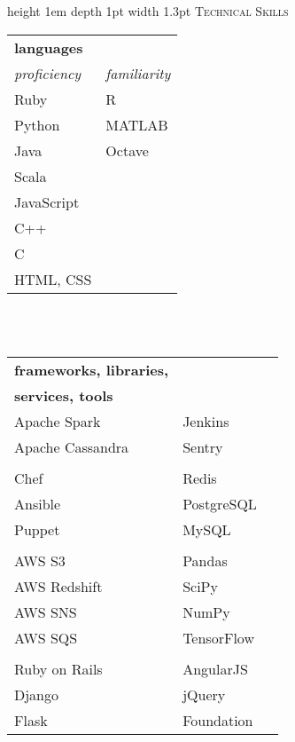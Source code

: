 \documentclass[letterpaper,10pt]{article}
\newcommand{\sectiontitle}[1]{
	{\color{magenta} \vline height 1em depth 1pt width 1.3pt}%
	{\large \colorbox{offwhite}{\color{black} \textsc{#1}}}
	\vspace*{0.5em}
}
\newcommand{\sectionseparator}{
	\vspace*{0.3em}
}
\begin{document}
\begin{minipage}[t]{0.30\textwidth}
		\sectionseparator

		\sectiontitle{Technical Skills}

		\begin{tabular}{l l}
			\textbf{languages} 	\\
			\textit{proficiency} 	& \textit{familiarity} \\
			Ruby 		& R \\
			Python 		& MATLAB \\
			Java 		& Octave \\
			Scala		& \\
			JavaScript 	& \\
			C++ 		& \\
			C 			& \\
			HTML, CSS  	& \\
		\end{tabular}
		\\
		\vspace*{0.3em}
		\\
		\begin{tabular}{l l l}
			\textbf{frameworks, libraries,}\\
			\textbf{services, tools}\\
			Apache Spark 		& Jenkins\\
			Apache Cassandra 	& Sentry\\
			\\
			Chef  				& Redis\\
			Ansible 			& PostgreSQL\\
			Puppet 				& MySQL\\
			\\
			AWS S3 				& Pandas\\
			AWS Redshift 		& SciPy\\
			AWS SNS 			& NumPy\\
			AWS SQS 			& TensorFlow\\
			\\
			Ruby on Rails  		& AngularJS\\
			Django  			& jQuery\\
			Flask 				& Foundation\\
		\end{tabular}

	\end{minipage}
\end{document}
